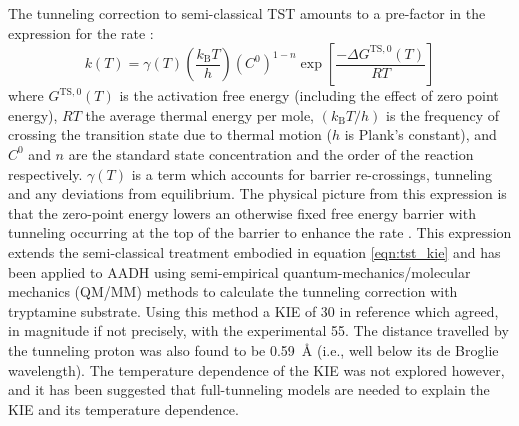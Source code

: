 The tunneling correction to semi-classical TST amounts to a pre-factor in the expression for the rate \cite{garciavilocaHowEnzymesWork2004}: 
\begin{equation}\label{eqn:tst}
k(T) =\gamma(T)\left(\frac{k_{\mathrm{B}} T}{h}\right)\left(C^{0}\right)^{1-n}\exp \left[\frac{-\Delta G^{\mathrm{TS}, 0}(T)}{R T}\right]
\end{equation}
where $G^{\mathrm{TS}, 0}(T)$ is the activation free energy (including the effect of zero point energy), $RT$ the average thermal energy per mole, $\left(k_{\mathrm{B}} T / h\right)$ is the frequency of crossing the transition state due to thermal motion ($h$ is Plank's constant), and $C^{0}$ and $n$ are the standard state concentration and the order of the reaction respectively. $\gamma(T)$ is a term which accounts for barrier re-crossings, tunneling and any deviations from equilibrium. The physical picture from this expression is that the zero-point energy lowers an otherwise fixed free energy barrier with tunneling occurring at the top of the barrier to enhance the rate \cite{garciavilocaHowEnzymesWork2004}. This expression extends the semi-classical treatment embodied in equation \ref{eqn:tst_kie} and has been applied to AADH \cite{masgrauAtomicDescriptionEnzyme2006, masgrauTunnelingClassicalPaths2007} using semi-empirical quantum-mechanics/molecular mechanics (QM/MM) methods to calculate the tunneling correction with tryptamine substrate. Using this method a KIE of \num{30} in reference  \cite{masgrauTunnelingClassicalPaths2007}  which agreed, in magnitude if not precisely, with the experimental \num{55}.  The distance travelled by the tunneling proton was also found to be \SI{0.59}{\angstrom} (i.e., well below its de Broglie wavelength). The temperature dependence of the KIE was not explored however, and it has been suggested \cite{klinmanHydrogenTunnelingLinks2013, johannissenProtonTunnelingAromatic2007, klinmanbeyond2009, puMultidimensionalTunnelingRecrossing2006} that full-tunneling models are needed to explain the KIE and its temperature dependence. 

